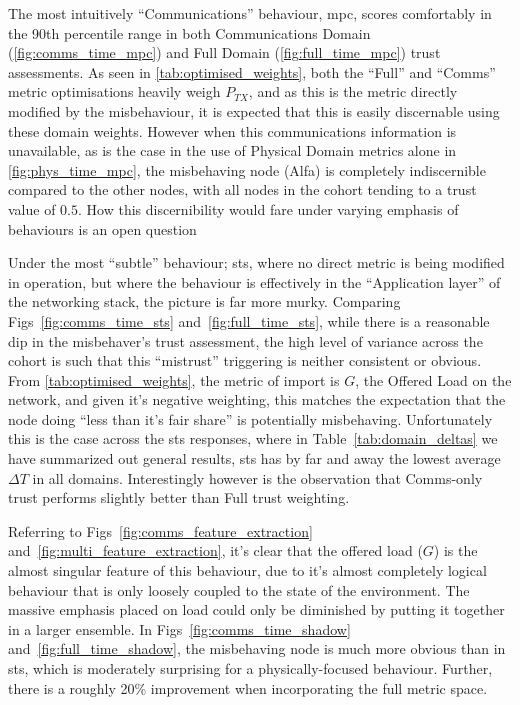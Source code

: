 The most intuitively ``Communications'' behaviour, \gls{mpc}, scores comfortably in the 90th percentile range in both Communications Domain (\autoref{fig:comms_time_mpc}) and Full Domain (\autoref{fig:full_time_mpc})  trust assessments. As seen in \autoref{tab:optimised_weights}, both the ``Full'' and ``Comms'' metric optimisations heavily weigh $P_{TX}$, and as this is the metric directly modified by the misbehaviour, it is expected that this is easily discernable using these domain weights.
However when this communications information is unavailable, as is the case in the use of Physical Domain metrics alone in \autoref{fig:phys_time_mpc}, the misbehaving node (Alfa) is completely indiscernible compared to the other nodes, with all nodes in the cohort tending to a trust value of $0.5$.
How this discernibility would fare under varying emphasis of behaviours is an open question

Under the most ``subtle'' behaviour; \gls{sts}, where no direct metric is being modified in operation, but where the behaviour is effectively in the ``Application layer'' of the networking stack, the picture is far more murky. 
Comparing Figs~\ref{fig:comms_time_sts} and~\ref{fig:full_time_sts}, while there is a reasonable dip in the misbehaver’s trust assessment, the high level of variance across the cohort is such that this ``mistrust'' triggering is neither consistent or obvious. 
From \autoref{tab:optimised_weights}, the metric of import is $G$, the Offered Load on the network, and given it's negative weighting, this matches the expectation that the node doing ``less than it's fair share'' is potentially misbehaving. 
Unfortunately this is the case across the \gls{sts} responses, where in Table~\ref{tab:domain_deltas} we have summarized out general results, \gls{sts} has by far and away the lowest average $\Delta T$ in all domains. 
Interestingly however is the observation that Comms-only trust performs slightly better than Full trust weighting.

Referring to Figs~\ref{fig:comms_feature_extraction} and~\autoref{fig:multi_feature_extraction}, it's clear that the offered load ($G$) is the almost singular feature of this behaviour, due to it's almost completely logical behaviour that is only loosely coupled to the state of the environment. 
The massive emphasis placed on load could only be diminished by putting it together in a larger ensemble.
In Figs~\ref{fig:comms_time_shadow} and~\ref{fig:full_time_shadow}, the misbehaving node is much more obvious than in \gls{sts}, which is moderately surprising for a physically-focused behaviour. Further, there is a roughly 20\% improvement when incorporating the full metric space.

